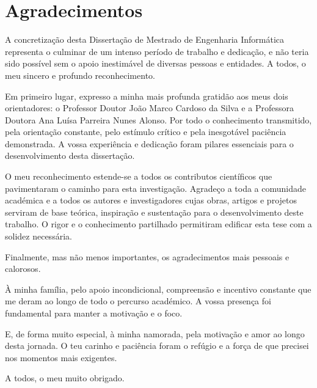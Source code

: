 \chapter*{Agradecimentos}
\setlength{\parskip}{1em}

A concretização desta Dissertação de Mestrado de Engenharia Informática representa o culminar de um intenso período de trabalho e dedicação, e não teria sido possível sem o apoio inestimável de diversas pessoas e entidades. A todos, o meu sincero e profundo reconhecimento.

Em primeiro lugar, expresso a minha mais profunda gratidão aos meus dois orientadores: o Professor Doutor João Marco Cardoso da Silva e a Professora Doutora Ana Luísa Parreira Nunes Alonso. Por todo o conhecimento transmitido, pela orientação constante, pelo estímulo crítico e pela inesgotável paciência demonstrada. A vossa experiência e dedicação foram pilares essenciais para o desenvolvimento desta dissertação.

O meu reconhecimento estende-se a todos os contributos científicos que pavimentaram o caminho para esta investigação. Agradeço a toda a comunidade académica e a todos os autores e investigadores cujas obras, artigos e projetos serviram de base teórica, inspiração e sustentação para o desenvolvimento deste trabalho. O rigor e o conhecimento partilhado permitiram edificar esta tese com a solidez necessária.

Finalmente, mas não menos importantes, os agradecimentos mais pessoais e calorosos.

À minha família, pelo apoio incondicional, compreensão e incentivo constante que me deram ao longo de todo o percurso académico. A vossa presença foi fundamental para manter a motivação e o foco.

E, de forma muito especial, à minha namorada, pela motivação e amor ao longo desta jornada. O teu carinho e paciência foram o refúgio e a força de que precisei nos momentos mais exigentes.

A todos, o meu muito obrigado.

\setlength{\parskip}{0em}

